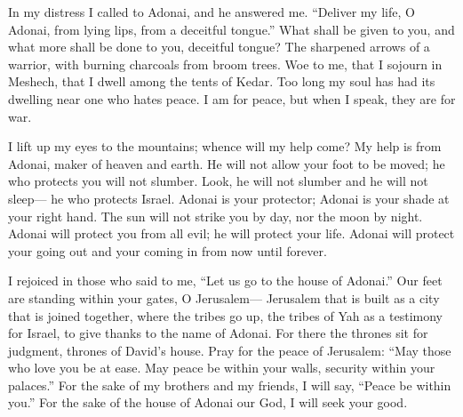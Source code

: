 \begin{biblechapter} %
 In my distress I called to Adonai, 
and he answered me.
\verse “Deliver my life, O Adonai, from lying lips, 
from a deceitful tongue.”
\verse What shall be given to you, 
and what more shall be done to you, 
deceitful tongue?
\verse The sharpened arrows of a warrior, 
with burning charcoals from broom trees.
\verse Woe to me, that I sojourn in Meshech, 
that I dwell among the tents of Kedar.
\verse Too long my soul has had its dwelling 
near one who hates peace.
\verse I am for peace, but when I speak, 
they are for war.
\end{biblechapter}

\begin{biblechapter} %
 I lift up my eyes to the mountains; 
whence will my help come?
\verse My help is from Adonai, 
maker of heaven and earth.
\verse He will not allow your foot to be moved; 
he who protects you will not slumber.
\verse Look, he will not slumber and he will not sleep— 
he who protects Israel.
\verse Adonai is your protector; 
Adonai is your shade at your right hand.
\verse The sun will not strike you by day, 
nor the moon by night.
\verse Adonai will protect you from all evil; 
he will protect your life.
\verse Adonai will protect your going out and your coming in 
from now until forever.
\end{biblechapter}

\begin{biblechapter} %
 I rejoiced in those who said to me, 
“Let us go to the house of Adonai.”
\verse Our feet are standing 
within your gates, O Jerusalem—
\verse Jerusalem that is built 
as a city that is joined together,
\verse where the tribes go up, 
the tribes of Yah as a testimony for Israel, 
to give thanks to the name of Adonai.
\verse For there the thrones sit for judgment, 
thrones of David’s house.
\verse Pray for the peace of Jerusalem: 
“May those who love you be at ease.
\verse May peace be within your walls, 
security within your palaces.”
\verse For the sake of my brothers and my friends, 
I will say, “Peace be within you.”
\verse For the sake of the house of Adonai our God, 
I will seek your good.
\end{biblechapter}

